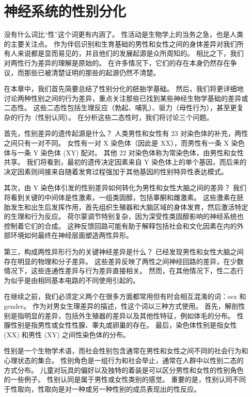 \chapter{神经系统的性别分化} \label{chap:chap51}

没有什么词比“性”这个词更有内涵了。
性活动是生物学上的当务之急，也是人类的主要关注点。
作为伴侣识别和生育基础的男性和女性之间的身体差异对我们所有人来说都是显而易见的，并且他们的发展起源是众所周知的。
相比之下，我们对两性行为差异的理解是原始的。
在许多情况下，它们的存在本身仍然存在争议，而那些已被清楚证明的那些的起源仍然不清楚。


在本章中，我们首先简要总结了性别分化的胚胎学基础。
然后，我们将更详细地讨论两种性别之间的行为差异，重点关注那些已找到某些神经生物学基础的差异或二态性。
这些二态性包括生理反应（勃起、哺乳）、驱力（母性行为），甚至更复杂的行为（性别认同）。
在分析这些二态性时，我们将讨论三个问题。


首先，性别差异的遗传起源是什么？
人类男性和女性有 23 对染色体的补充，两性之间只有一对不同。
女性有一对 X 染色体（因此是 XX），而男性有一条 X 染色体与一条 Y 染色体 (XY) 配对。
其他 22 对染色体称为常染色体，由男性和女性共享。
我们将看到，最初的遗传决定因素来自 Y 染色体上的单个基因，而后来的决定因素则间接来自随着发育过程强加于其他基因的性别特异性表达模式。


其次，由 Y 染色体引发的性别差异如何转化为男性和女性大脑之间的差异？
我们将看到关键的中间体是性激素，一组类固醇，包括睾酮和雌激素。
这些激素在胚胎发生和出生后发挥作用，首先组织生殖器和大脑区域的身体发育，然后激活特定的生理和行为反应。
荷尔蒙调节特别复杂，因为深受性类固醇影响的神经系统也控制着它们的合成。
这种反馈回路可能有助于解释包括社会和文化因素在内的外部环境如何最终在神经层面塑造两性异形。


第三，构成两性异形行为的关键神经差异是什么？
已经发现男性和女性大脑之间存在明显的物理和分子差异。
这些差异反映了两性之间神经回路的差异，在少数情况下，这些连通性差异与行为差异直接相关。
然而，在其他情况下，性二态行为似乎是由相同基本电路的不同使用引起的。


在继续之前，我们必须定义两个在很多方面都常用但有时会相互混淆的词：sex 和 gender。
作为对男女生理差异的描述，性这个词以三种方式使用。
首先，解剖性别是指明显的差异，包括外生殖器的差异以及其他性特征，例如体毛的分布。
性腺性别是指男性或女性性腺、睾丸或卵巢的存在。
最后，染色体性别是指女性 (XX) 和男性 (XY) 之间性染色体的分布。


性别是一个生物学术语，而社会性别包含通常在男性和女性之间不同的社会行为和心理状态的集合。
性别角色是一组行为和社会举止，通常在人群中以性别二态的方式分布。
儿童对玩具的偏好以及独特的着装是可以区分男性和女性的性别角色的一些例子。
性别认同是属于男性或女性类别的感觉。
重要的是，性别认同不同于性取向，性取向是对一种或另一种性别的成员表现出的性反应。


